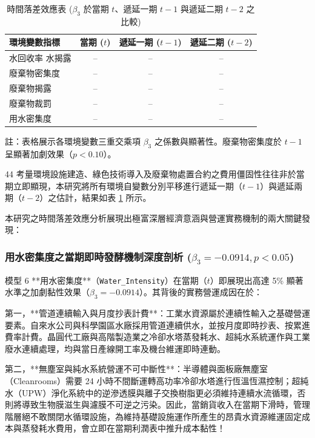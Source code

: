 \documentclass[12pt,a4paper]{article}
\begin{document}
\begin{table}[H]
\centering
\caption{時間落差效應表 ($\beta_3$ 於當期 $t$、遞延一期 $t-1$ 與遞延二期 $t-2$ 之比較)}
\label{tab:lag_reg}
\begin{threeparttable}
\small
\begin{tabular}{lccc}
\toprule
環境變數指標 & 當期 ($t$) & 遞延一期 ($t-1$) & 遞延二期 ($t-2$) \\
\midrule
水回收率%
水揭露 & -- & -- & -- \\
廢棄物密集度 & -- & -- & -- \\
廢棄物揭露 & -- & -- & -- \\
廢棄物裁罰 & -- & -- & -- \\
用水密集度 & -- & -- & -- \\
\bottomrule
\end{tabular}
\begin{tablenotes}
\small
\item 註：表格展示各環境變數三重交乘項 $\beta_3$ 之係數與顯著性。廢棄物密集度於 $t-1$ 呈顯著加劇效果（$p < 0.10$）。
\end{tablenotes}
\end{threeparttable}
\end{table}
44
考量環境設施建造、綠色技術導入及廢棄物處置合約之費用僵固性往往非於當期立即顯現，本研究將所有環境自變數分別平移進行遞延一期（$t-1$）與遞延兩期（$t-2$）之估計，結果如表 \ref{tab:lag_reg} 所示。

本研究之時間落差效應分析展現出極富深層經濟意涵與營運實務機制的兩大關鍵發現：

\subsubsection{用水密集度之當期即時發酵機制深度剖析 \texorpdfstring{($\beta_3 = -0.0914, p < 0.05$)}{(beta3 = -0.0914, p < 0.05)}}

模型 6 **用水密集度**（\texttt{Water\_Intensity}）在當期（$t$）即展現出高達 5\% 顯著水準之加劇黏性效果（$\beta_3 = -0.0914$）。其背後的實務營運成因在於：

第一，**管道連續輸入與月度抄表計費**：工業水資源屬於連續性輸入之基礎營運要素。自來水公司與科學園區水廠採用管道連續供水，並按月度即時抄表、按累進費率計費。晶圓代工廠與高階製造業之冷卻水塔蒸發耗水、超純水系統運作與工業廢水連續處理，均與當日產線開工率及機台維運即時連動。

第二，**無塵室與純水系統營運不可中斷性**：半導體與面板廠無塵室（Cleanrooms）需要 24 小時不間斷運轉高功率冷卻水塔進行恆溫恆濕控制；超純水（UPW）淨化系統中的逆滲透膜與離子交換樹脂更必須維持連續水流循環，否則將導致生物膜滋生與濾膜不可逆之污染。因此，當銷貨收入在當期下滑時，管理階層絕不敢關閉水循環設施，為維持基礎設施運作所產生的昂貴水資源維運固定成本與蒸發耗水費用，會立即在當期利潤表中推升成本黏性！
\end{document}
